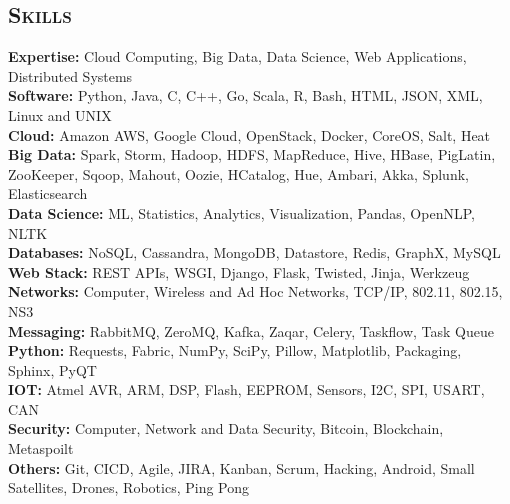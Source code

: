 \begin{resume}


\section{\textsc{Skills}}
{\bf Expertise:} Cloud Computing, Big Data, Data Science, Web Applications, Distributed Systems
\\ {\bf Software:} Python, Java, C, C++, Go, Scala, R, Bash, HTML, JSON, XML, Linux and UNIX
\\ {\bf Cloud:} Amazon AWS, Google Cloud, OpenStack, Docker, CoreOS, Salt, Heat
\\ {\bf Big Data:} Spark, Storm, Hadoop, HDFS, MapReduce, Hive, HBase, PigLatin, ZooKeeper, Sqoop, Mahout, Oozie, HCatalog, Hue, Ambari, Akka, Splunk, Elasticsearch
\\ {\bf Data Science:} ML, Statistics, Analytics, Visualization, Pandas, OpenNLP, NLTK
\\ {\bf Databases:} NoSQL, Cassandra, MongoDB, Datastore, Redis, GraphX, MySQL
\\ {\bf Web Stack:} REST APIs, WSGI, Django, Flask, Twisted, Jinja, Werkzeug 
\\ {\bf Networks:} Computer, Wireless and Ad Hoc Networks, TCP/IP, 802.11, 802.15, NS3
\\ {\bf Messaging:} RabbitMQ, ZeroMQ, Kafka, Zaqar, Celery, Taskflow, Task Queue
\\ {\bf Python:} Requests, Fabric, NumPy, SciPy, Pillow, Matplotlib, Packaging, Sphinx, PyQT
\\ {\bf IOT:} Atmel AVR, ARM, DSP, Flash, EEPROM, Sensors, I2C, SPI, USART, CAN
\\ {\bf Security:} Computer, Network and Data Security, Bitcoin, Blockchain, Metaspoilt
\\ {\bf Others:} Git, CICD, Agile, JIRA, Kanban, Scrum, Hacking, Android, Small Satellites, Drones, Robotics, Ping Pong


\end{resume}
